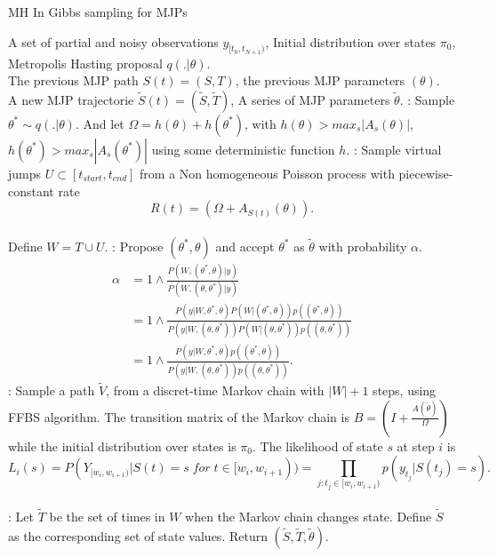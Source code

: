 \begin{algorithm}[H]
   \caption{MH In Gibbs sampling for MJPs }
   \label{alg:MH In Gibbs}
\begin{algorithmic}
    A set of partial and noisy observations $y_{[t_0, t_{N+1})}$, Initial distribution over states $\pi_0$,  Metropolis Hasting proposal $q(. | \theta)$.\\
   The previous MJP path $S(t) = (S, T)$, the previous MJP parameters $(\theta)$.\\  
       A new MJP trajectorie $\tilde{S} (t) = (\tilde{S}, \tilde{T})$, A series of MJP parameters $\tilde{\theta}$.
      :  Sample $\theta^* \sim q(.| \theta)$. And let $\Omega = h(\theta) + h(\theta^*)$, with $h(\theta) > max_s{|A_s(\theta)|}$, $h(\theta^*) > max_s{|A_s(\theta^*)|}$ using some deterministic function $h$.
    : Sample virtual jumps $U\subset[t_{start}, t_{end}]$ from a Non homogeneous Poisson process with piecewise-constant rate$$R(t) = (\Omega + A_{S(t)}(\theta)).$$\\Define $W = T \cup U$.
    : Propose $(\theta^*, \theta)$ and accept $\theta^*$ as $\tilde{\theta}$ with probability $\alpha$.
        \begin{align*}
        \alpha &=  1 \wedge \frac{P(W,(\theta^*, \theta)| y)}{P(W, (\theta, \theta^*)| y)}\\
        &=  1 \wedge \frac{P(y| W,\theta^*, \theta) P(W | (\theta^*, \theta))p((\theta^*, \theta))}{P(y| W,(\theta, \theta^*)) P(W | (\theta, \theta^*))p((\theta, \theta^*))}\\
                &=  1 \wedge \frac{P(y| W,\theta^*, \theta)p((\theta^*, \theta))}{P(y| W,(\theta, \theta^*))p((\theta, \theta^*))}.
        \end{align*}
    : Sample a path $\tilde{V}$, from a discret-time Markov chain with $|W| + 1$ steps, using FFBS algorithm. The transition matrix of the Markov chain is $B = (I + \frac{A(\tilde{\theta})}{\Omega})$ while the initial distribution over states is $\pi_0$. The likelihood of state $s$ at step $i$ is 
    $$ L_i(s) = P(Y_{[w_i, w_{i + 1})} | S(t) = s \; for\; t \in [w_i, w_{i + 1})) = \prod_{j: t_j \in [w_i, w_{i + 1})}p(y_{t_j} | S(t_j) = s).$$\\
    : Let $\tilde{T}$ be the set of times in $W$ when the Markov chain changes state. Define $\tilde{S}$ as the corresponding set of state values. Return $(\tilde{S}, \tilde{T}, \tilde{\theta})$.\\
\end{algorithmic}
\end{algorithm}

